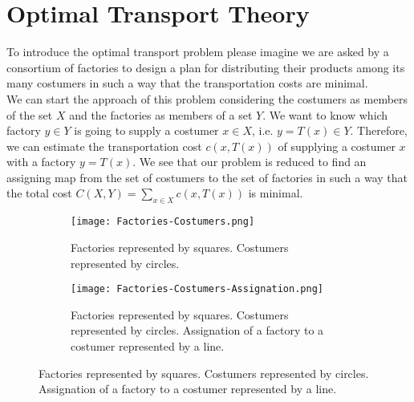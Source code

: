 \chapter{Optimal Transport Theory}

To introduce the optimal transport problem please imagine we are asked by a consortium of factories to design a plan for distributing their products among its many costumers in such a way that the transportation costs are minimal. \\


We can start the approach of this problem considering the costumers as members of the set $X$ and the factories as members of a set $Y$. We want to know which factory $y\in Y$ is going to supply a costumer $x\in X$, i.e. $y=T(x)\in Y$. Therefore, we can estimate the transportation cost $c(x, T(x))$ of supplying a costumer $x$ with a factory $y=T(x)$. We see that our problem is reduced to find an assigning map from the set of costumers to the set of factories in such a way that the total cost $C(X, Y)=\sum_{x\in X} c(x, T(x))$ is minimal.  
\\
\begin{figure}[H]
	\centering
	\caption{Illustration of the problem of Factories supplying Costumers.}
	\begin{subfigure}[t]{0.4\textwidth}
		\texttt{[image: Factories-Costumers.png]}
		\caption{Factories represented by squares. Costumers represented by circles.}
	\end{subfigure}
	\hfil
	\begin{subfigure}[t]{0.4\textwidth}
		\texttt{[image: Factories-Costumers-Assignation.png]}
		\caption{Factories represented by squares. Costumers represented by circles. Assignation of a factory to a costumer represented by a line.}
	\end{subfigure}	
\end{figure}

